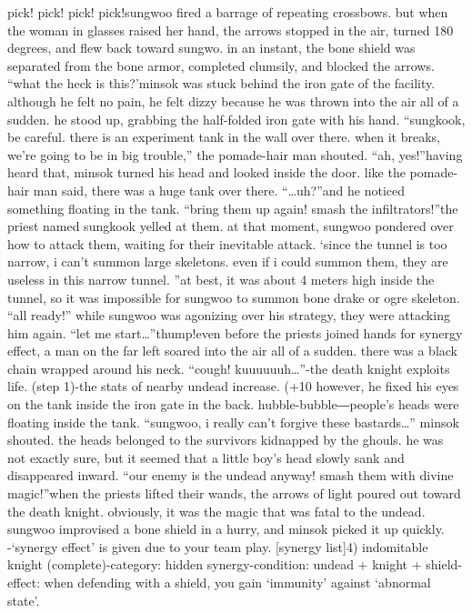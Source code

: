 pick! pick! pick! pick!sungwoo fired a barrage of repeating crossbows.
 but when the woman in glasses raised her hand, the arrows stopped in the air, turned 180 degrees, and flew back toward sungwo.
in an instant, the bone shield was separated from the bone armor, completed clumsily, and blocked the arrows.
“what the heck is this?’minsok was stuck behind the iron gate of the facility.
 although he felt no pain, he felt dizzy because he was thrown into the air all of a sudden.
 he stood up, grabbing the half-folded iron gate with his hand.
“sungkook, be careful.
 there is an experiment tank in the wall over there.
 when it breaks, we’re going to be in big trouble,” the pomade-hair man shouted.
“ah, yes!”having heard that, minsok turned his head and looked inside the door.
 like the pomade-hair man said, there was a huge tank over there.
“…uh?”and he noticed something floating in the tank.
“bring them up again! smash the infiltrators!”the priest named sungkook yelled at them.
at that moment, sungwoo pondered over how to attack them, waiting for their inevitable attack.
‘since the tunnel is too narrow, i can’t summon large skeletons.
 even if i could summon them, they are useless in this narrow tunnel.
”at best, it was about 4 meters high inside the tunnel, so it was impossible for sungwoo to summon bone drake or ogre skeleton.
“all ready!”
while sungwoo was agonizing over his strategy, they were attacking him again.
“let me start…”thump!even before the priests joined hands for synergy effect, a man on the far left soared into the air all of a sudden.
 there was a black chain wrapped around his neck.
“cough! kuuuuuuh…”-the death knight exploits life.
 (step 1)-the stats of nearby undead increase.
 (+10%
 however, he fixed his eyes on the tank inside the iron gate in the back.
hubble-bubble―people’s heads were floating inside the tank.
“sungwoo, i really can’t forgive these bastards…” minsok shouted.
the heads belonged to the survivors kidnapped by the ghouls.
 he was not exactly sure, but it seemed that a little boy’s head slowly sank and disappeared inward.
“our enemy is the undead anyway! smash them with divine magic!”when the priests lifted their wands, the arrows of light poured out toward the death knight.
obviously, it was the magic that was fatal to the undead.
sungwoo improvised a bone shield in a hurry, and minsok picked it up quickly.
-‘synergy effect’ is given due to your team play.
[synergy list]4) indomitable knight (complete)-category: hidden synergy-condition: undead + knight + shield-effect: when defending with a shield, you gain ‘immunity’ against ‘abnormal state’.
